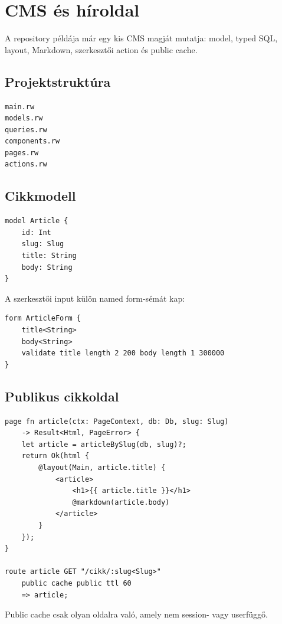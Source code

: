 \section{CMS és híroldal}

A repository  példája már egy kis CMS magját mutatja: model, typed SQL, layout, Markdown, szerkesztői action és public cache.

\subsection*{Projektstruktúra}

\begin{lstlisting}
main.rw
models.rw
queries.rw
components.rw
pages.rw
actions.rw
\end{lstlisting}

\subsection*{Cikkmodell}

\begin{lstlisting}[language=RWLang]
model Article {
    id: Int
    slug: Slug
    title: String
    body: String
}
\end{lstlisting}

A szerkesztői input külön named form-sémát kap:

\begin{lstlisting}[language=RWLang]
form ArticleForm {
    title<String>
    body<String>
    validate title length 2 200 body length 1 300000
}
\end{lstlisting}

\subsection*{Publikus cikkoldal}

\begin{lstlisting}[language=RWLang]
page fn article(ctx: PageContext, db: Db, slug: Slug)
    -> Result<Html, PageError> {
    let article = articleBySlug(db, slug)?;
    return Ok(html {
        @layout(Main, article.title) {
            <article>
                <h1>{{ article.title }}</h1>
                @markdown(article.body)
            </article>
        }
    });
}

route article GET "/cikk/:slug<Slug>"
    public cache public ttl 60
    => article;
\end{lstlisting}

Public cache csak olyan oldalra való, amely nem session- vagy userfüggő.

